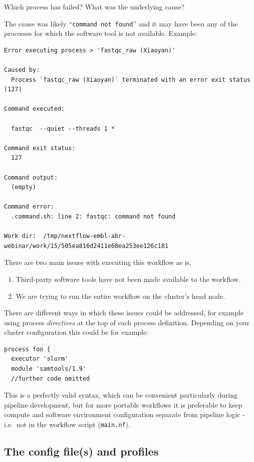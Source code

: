 \begin{questions}
Which process has failed?
What was the underlying cause?
\begin{answer}
The cause was likely ``\texttt{command not found}'' and it may have been any of the processes for which the software tool is not available.
Example:
\begin{lstlisting}
Error executing process > 'fastqc_raw (Xiaoyan)'

Caused by:
  Process `fastqc_raw (Xiaoyan)` terminated with an error exit status (127)

Command executed:

  fastqc  --quiet --threads 1 *

Command exit status:
  127

Command output:
  (empty)

Command error:
  .command.sh: line 2: fastqc: command not found

Work dir:  /tmp/nextflow-embl-abr-webinar/work/15/505ea816d2411e68ea253ee126c181
\end{lstlisting}
\end{answer}
\end{questions}


There are two main issues with executing this workflow as is, 
\begin{enumerate}
 \item Third-party software tools have not been made available to the workflow.
 \item We are trying to run the entire workflow on the cluster's head node.
\end{enumerate}

There are different ways in which these issues could be addressed, for example using process 
\emph{directives} at the top of each process definition. 
Depending on your cluster configuration this could be for example:
\begin{lstlisting}
process foo {
  executor 'slurm' 
  module 'samtools/1.9' 
  //further code omitted 
\end{lstlisting}

This is a perfectly valid syntax, which can be convenient particularly during pipeline development, but for more portable workflows it is preferable to keep compute and software environment configuration separate from pipeline logic - i.e.\ not in the workflow script (\texttt{main.nf}).

\subsection{The config file(s) and profiles}


